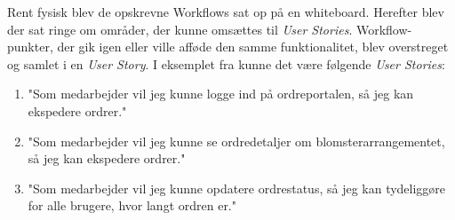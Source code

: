 Rent fysisk blev de opskrevne Workflows sat op på en whiteboard. Herefter blev der sat ringe om områder, der kunne omsættes til \emph{User Stories}.
Workflow-punkter, der gik igen eller ville afføde den samme funktionalitet, blev overstreget og samlet i en \emph{User Story}.
I eksemplet fra  kunne det være følgende \emph{User Stories}:
\begin{enumerate}
    \item "Som medarbejder vil jeg kunne logge ind på ordreportalen, så jeg kan ekspedere ordrer."
    \item "Som medarbejder vil jeg kunne se ordredetaljer om blomsterarrangementet, så jeg kan ekspedere ordrer."
    \item "Som medarbejder vil jeg kunne opdatere ordrestatus, så jeg kan tydeliggøre for alle brugere, hvor langt ordren er."
    \label{item:workflow-us-eksempel}
\end{enumerate}

